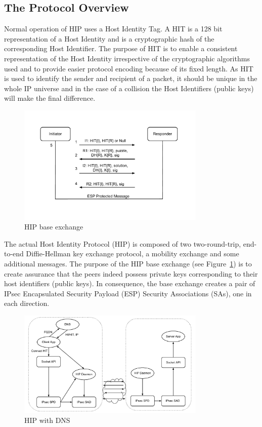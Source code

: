 \subsection{The Protocol Overview}
Normal operation of HIP uses a Host Identity Tag. A HIT is a 128 bit representation of a Host Identity and is a cryptographic hash of the corresponding Host Identifier. The purpose of HIT is to enable a consistent representation of the Host Identity irrespective of the cryptographic algorithms used and to provide easier protocol encoding because of its fixed length. As HIT is used to identify the sender and recipient of a packet, it should be unique in the whole IP universe and in the case of a collision the Host Identifiers (public keys) will make the final difference.

\begin{figure}[htb!]
\centering
\includegraphics[width=0.8\textwidth]{images/HIP_figure2}
\caption{HIP base exchange}
\label{fig:HIP_be}
\end{figure}

The actual Host Identity Protocol (HIP) is composed of two two-round-trip, end-to-end Diffie-Hellman key exchange protocol, a mobility exchange and some additional messages. The purpose of the HIP base exchange (see Figure~\ref{fig:HIP_be}) is to create assurance that the peers indeed possess private keys corresponding to their host identifiers (public keys). In consequence, the base exchange creates a pair of IPsec Encapsulated Security Payload (ESP) Security Associations (SAs), one in each direction.

\begin{figure}[htb!]
\centering
\includegraphics[width=0.8\textwidth]{images/HIP_figure3}
\caption{HIP with DNS}
\label{fig:HIP_DNS}
\end{figure}

